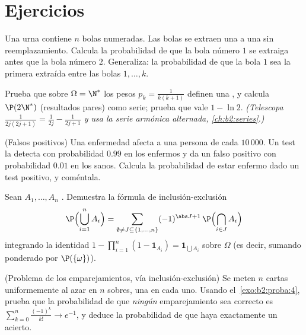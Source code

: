 \section{Ejercicios}

\begin{exercise}[$\star$]\label{exo:b2:proba:1}
Una urna contiene $n$ bolas numeradas. Las bolas se extraen una a una
sin reemplazamiento. Calcula la probabilidad de que la bola número
$1$ se extraiga antes que la bola número $2$. Generaliza: la
probabilidad de que la bola $1$ sea la primera extraída entre las
bolas $1, \dots, k$.
\end{exercise}

\begin{exercise}[$\star$]\label{exo:b2:proba:2}
Prueba que sobre $\Omega = \N^*$ los pesos $p_k = \frac{1}{k(k+1)}$
definen una , y calcula $\P(2\N^*)$ (resultados
pares) como serie; prueba que vale $1 - \ln 2$. \emph{(Telescopa
$\frac{1}{2j(2j+1)} = \frac{1}{2j} - \frac{1}{2j+1}$ y usa la serie
armónica alternada, \cref{ch:b2:series}.)}
\end{exercise}

\begin{exercise}[$\star$]\label{exo:b2:proba:3}
(Falsos positivos) Una enfermedad afecta a una persona de cada
$10\,000$. Un test la detecta con probabilidad $0.99$ en los enfermos
y da un falso positivo con probabilidad $0.01$ en los sanos. Calcula
la probabilidad de estar enfermo dado un test positivo, y coméntala.
\end{exercise}

\begin{exercise}[$\star\star$]\label{exo:b2:proba:4}
Sean $A_1, \dots, A_n$ . Demuestra la fórmula de
inclusión-exclusión
\[
\P\Bigl(\bigcup_{i=1}^n A_i\Bigr)
= \sum_{\emptyset \neq J \subseteq \{1,\dots,n\}}
(-1)^{\abs J + 1}\,\P\Bigl(\bigcap_{i \in J}A_i\Bigr)
\]
integrando la identidad $1 - \prod_{i=1}^n(1 - \mathbf{1}_{A_i}) =
\mathbf{1}_{\bigcup A_i}$ sobre $\Omega$ (es decir, sumando ponderado
por $\P(\{\omega\})$).
\end{exercise}

\begin{exercise}[$\star\star$]\label{exo:b2:proba:5}
(Problema de los emparejamientos, vía inclusión-exclusión) Se meten
$n$ cartas uniformemente al azar en $n$ sobres, una en cada uno.
Usando el~\cref{exo:b2:proba:4}, prueba que la probabilidad de que
\emph{ningún} emparejamiento sea correcto es $\sum_{k=0}^n
\frac{(-1)^k}{k!} \to e^{-1}$, y deduce la probabilidad de que haya
exactamente un acierto.
\end{exercise}

